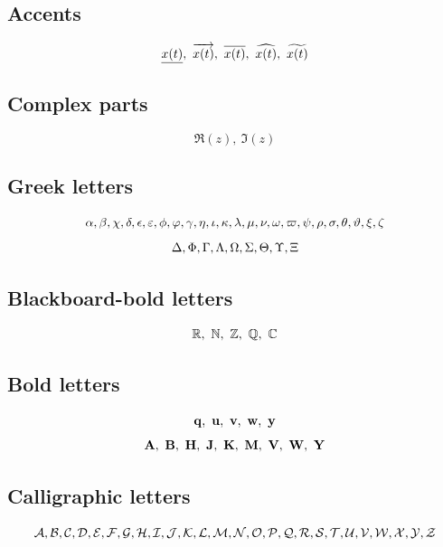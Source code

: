 \documentclass[11pt]{article}
\begin{document}
\subsection*{Accents}
\[
\ul{x(t)},\ \oa{x(t)},\ \ol{x(t)},\ \wh{x(t)},\ \wt{x(t)}
\]

\subsection*{Complex parts}
\[
\Re(z),\ \Im(z)
\]

\subsection*{Greek letters}

\[
\a,\b,\c,\d,\e,\ve,\f,\vf,\g,\h,\i,\k,\l,\m,\n,\o,\vp,\p,\r,\s,\t,\vt,\x,\z
\]
\[
\D,\F,\G,\L,\O,\S,\T,\U,\X
\]

\subsection*{Blackboard-bold letters}
\[
\R,\ \N,\ \Z,\ \Q,\ \C
\]

\subsection*{Bold letters}
\[
\q,\ \u,\ \v,\ \w,\ \y
\]
\[
\A,\ \B,\ \H,\ \J,\ \K,\ \M,\ \V,\ \W,\ \Y 
\]

\subsection*{Calligraphic letters}
\[
\Ac,\Bc,\Cc,\Dc,\Ec,\Fc,\Gc,\Hc,\Ic,\Jc,\Kc,\Lc,\Mc,\Nc,\Oc,\Pc,\Qc,\Rc,\Sc,\Tc,\Uc,\Vc,\Wc,\Xc,\Yc,\Zc
\]
\end{document}

